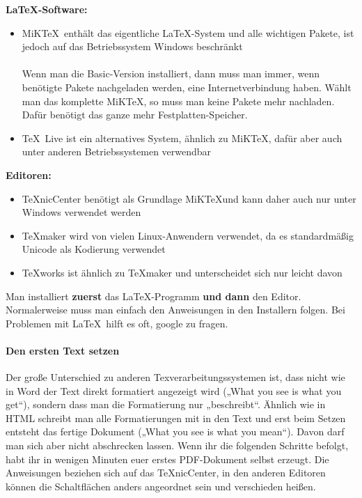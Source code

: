 \textbf{\LaTeX -Software:}
\begin{itemize}
    \item MiK\TeX~enthält das eigentliche \LaTeX-System und alle wichtigen Pakete, ist jedoch auf das Betriebssystem Windows beschränkt \\
        \\
        Wenn man die Basic-Version installiert, dann muss man immer, wenn benötigte Pakete nachgeladen werden, eine Internetverbindung haben.
        Wählt man das komplette MiK\TeX, so muss man keine Pakete mehr nachladen.
        Dafür benötigt das ganze mehr Festplatten-Speicher.
    \item \TeX~Live ist ein alternatives System, ähnlich zu MiK\TeX, dafür aber auch unter anderen Betriebssystemen verwendbar \\
\end{itemize}

\textbf{Editoren:}
\begin{itemize}
    \item \TeX nicCenter benötigt als Grundlage MiK\TeX und kann daher auch nur unter Windows verwendet werden \\
    \item \TeX maker wird von vielen Linux-Anwendern verwendet, da es standardmäßig Unicode als Kodierung verwendet \\
    \item \TeX works ist ähnlich zu \TeX maker und unterscheidet sich nur leicht davon \\
\end{itemize}

Man installiert \textbf{zuerst} das \LaTeX-Programm \textbf{und dann} den Editor.
Normalerweise muss man einfach den Anweisungen in den Installern folgen.
Bei Problemen mit \LaTeX~hilft es oft, google zu fragen.

\paragraph{Den ersten Text setzen}
Der große Unterschied zu anderen Texverarbeitungssystemen ist, dass nicht wie in Word der Text direkt formatiert angezeigt wird („What you see is what you get“), sondern dass man die Formatierung nur „beschreibt“.
Ähnlich wie in HTML schreibt man alle Formatierungen mit in den Text und erst beim Setzen entsteht das fertige Dokument („What you see is what you mean“).
Davon darf man sich aber nicht abschrecken lassen.
Wenn ihr die folgenden Schritte befolgt, habt ihr in wenigen Minuten euer erstes PDF-Dokument selbst erzeugt.
Die Anweisungen beziehen sich auf das \TeX nicCenter, in den anderen Editoren können die Schaltflächen anders angeordnet sein und verschieden heißen.


